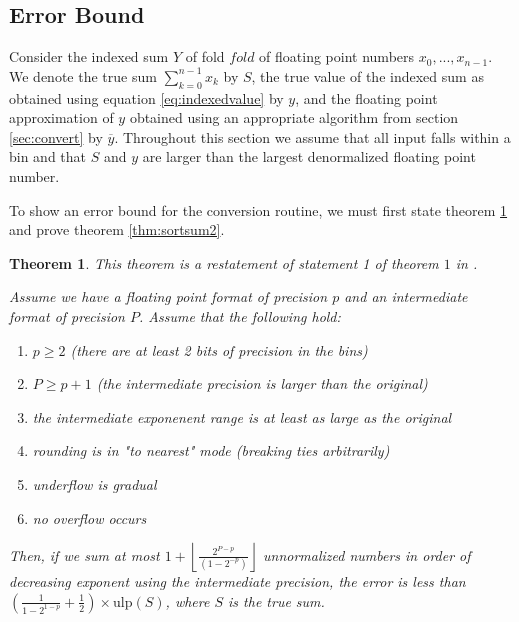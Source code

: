 \documentclass[12pt]{article}
\providecommand{\floor}[1]{\left \lfloor #1 \right \rfloor }
\providecommand{\ulp}{\ensuremath{\text{ulp}}}
\theoremstyle{plain}
\newtheorem{thm}{Theorem}[section]
\begin{document}
  \subsection{Error Bound}
    Consider the indexed sum $Y$ of fold $fold$ of floating point numbers $x_0, ..., x_{n - 1}$. We denote the true sum $\sum \limits_{k = 0}^{n - 1} x_k$ by $S$, the true value of the indexed sum as obtained using equation \ref{eq:indexedvalue} by $y$, and the floating point approximation of $y$ obtained using an appropriate algorithm from section \ref{sec:convert} by $\overline{y}$.
    Throughout this section we assume that all input falls within a bin and that $S$ and $y$ are larger than the largest denormalized floating point number.

    To show an error bound for the conversion routine, we must first state theorem \ref{thm:sortsum} and prove theorem \ref{thm:sortsum2}.

    \begin{thm}
      This theorem is a restatement of statement 1 of theorem $1$ in \cite{sortsum}.

      Assume we have a floating point format of precision $p$ and an intermediate format of precision $P$. Assume that the following hold:
      \begin{enumerate}
        \item $p \geq 2$ (there are at least 2 bits of precision in the bins)
        \item $P \geq p + 1$ (the intermediate precision is larger than the original)
        \item the intermediate exponenent range is at least as large as the original
        \item rounding is in "to nearest" mode (breaking ties arbitrarily)
        \item underflow is gradual
        \item no overflow occurs
      \end{enumerate}
      Then, if we sum at most $1 + \floor{\frac{2^{P - p}}{(1 - 2^{-p})}}$ unnormalized numbers in order of decreasing exponent using the intermediate precision, the error is less than $(\frac{1}{1 - 2^{1 - p}} + \frac{1}{2})\times \ulp(S)$, where $S$ is the true sum.
      \label{thm:sortsum}
    \end{thm}
\end{document}
